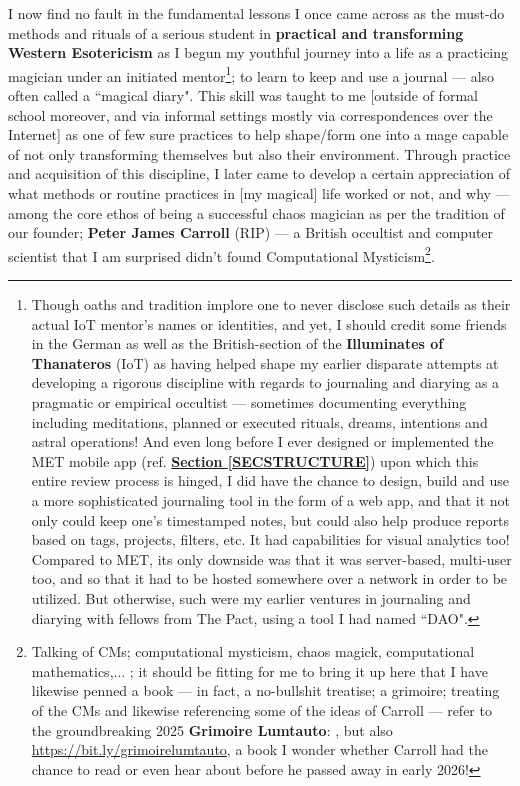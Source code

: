 \documentclass[a4paper]{article}
\begin{document}
I now find no fault in the fundamental lessons I once came across as the must-do methods and rituals of a serious student in \textbf{practical and transforming Western Esotericism} as I begun my youthful journey into a life as a practicing magician under an initiated mentor\footnote{Though oaths and tradition implore one to never disclose such details as their actual IoT mentor's names or identities, and yet, I should credit some friends in the German as well as the British-section of the \textbf{Illuminates of Thanateros} (IoT) as having helped shape my earlier disparate attempts at developing a rigorous discipline with regards to journaling and diarying as a pragmatic or empirical occultist --- sometimes documenting everything including meditations, planned or executed rituals, dreams, intentions and astral operations! And even long before I ever designed or implemented the MET mobile app (ref. \textbf{\hyperref[SECSTRUCTURE]{Section \ref{SECSTRUCTURE}}}) upon which this entire review process is hinged, I did have the chance to design, build and use a more sophisticated journaling tool in the form of a web app, and that it not only could keep one's timestamped notes, but could also help produce reports based on tags, projects, filters, etc. It had capabilities for visual analytics too! Compared to MET, its only downside  was that it was server-based, multi-user too, and so that it had to be hosted somewhere over a network in order to be utilized. But otherwise, such were my earlier ventures in journaling and diarying with fellows from The Pact, using a tool I had named ``DAO".}; to learn to keep and use a journal --- also often called a ``magical diary". This skill was taught to me [outside of formal school moreover, and via informal settings mostly via correspondences over the Internet] as one of few sure practices to help shape/form one into a mage capable of not only transforming themselves but also their environment.  Through practice and acquisition of this discipline, I later came to develop a certain appreciation of what methods or routine practices in [my magical] life worked or not, and why --- among the core ethos of being a successful chaos magician as per the tradition of our founder; \textbf{Peter James Carroll} (RIP) --- a British occultist and computer scientist that I am surprised didn't found Computational Mysticism\footnote{Talking of CMs; computational mysticism, chaos magick, computational mathematics,... ; it should be fitting for me to bring it up here that I have likewise penned a book --- in fact, a no-bullshit treatise; a grimoire; treating of the CMs and likewise referencing some of the ideas of Carroll --- refer to the groundbreaking 2025 \textbf{Grimoire Lumtauto}: \cite{lutalo_2025_grimlumtauto}, but also \url{https://bit.ly/grimoirelumtauto}, a book I wonder whether Carroll had the chance to read or even hear about before he passed away in early 2026!}.
\end{document}
